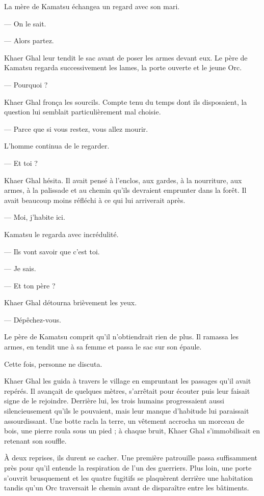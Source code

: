 La mère de Kamatsu échangea un regard avec son mari.

— On le sait.

— Alors partez.

Khaer Ghal leur tendit le sac avant de poser les armes devant eux. Le père de
Kamatsu regarda successivement les lames, la porte ouverte et le jeune Orc.

— Pourquoi ?

Khaer Ghal fronça les sourcils. Compte tenu du temps dont ils disposaient, la
question lui semblait particulièrement mal choisie.

— Parce que si vous restez, vous allez mourir.

L'homme continua de le regarder.

— Et toi ?

Khaer Ghal hésita. Il avait pensé à l'enclos, aux gardes, à la nourriture, aux
armes, à la palissade et au chemin qu'ils devraient emprunter dans la forêt.
Il avait beaucoup moins réfléchi à ce qui lui arriverait après.

— Moi, j'habite ici.

Kamatsu le regarda avec incrédulité.

— Ils vont savoir que c'est toi.

— Je sais.

— Et ton père ?

Khaer Ghal détourna brièvement les yeux.

— Dépêchez-vous.

Le père de Kamatsu comprit qu'il n'obtiendrait rien de plus. Il ramassa les
armes, en tendit une à sa femme et passa le sac sur son épaule.

Cette fois, personne ne discuta.

\scenebreak

Khaer Ghal les guida à travers le village en empruntant les passages qu'il
avait repérés. Il avançait de quelques mètres, s'arrêtait pour écouter puis
leur faisait signe de le rejoindre. Derrière lui, les trois humains
progressaient aussi silencieusement qu'ils le pouvaient, mais leur manque
d'habitude lui paraissait assourdissant. Une botte racla la terre, un vêtement
accrocha un morceau de bois, une pierre roula sous un pied ; à chaque bruit,
Khaer Ghal s'immobilisait en retenant son souffle.

À deux reprises, ils durent se cacher. Une première patrouille passa
suffisamment près pour qu'il entende la respiration de l'un des guerriers. Plus
loin, une porte s'ouvrit brusquement et les quatre fugitifs se plaquèrent
derrière une habitation tandis qu'un Orc traversait le chemin avant de
disparaître entre les bâtiments.

